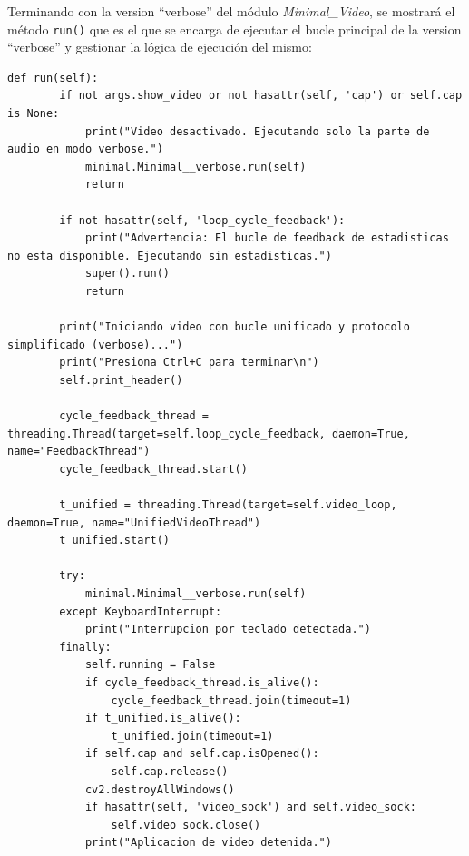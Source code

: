 Terminando con la version ``verbose'' del módulo \textit{Minimal\_Video}, se mostrará el método \texttt{run()} que es el que se encarga de ejecutar el bucle principal de la version ``verbose'' y gestionar la lógica de ejecución del mismo:
\begin{lstlisting}[style=pythonstyle, caption={Método \texttt{run()} de \textit{Minimal\_Video\_verbose}.}, label={lst:run_minimal_video_verbose}]
def run(self):
        if not args.show_video or not hasattr(self, 'cap') or self.cap is None:
            print("Video desactivado. Ejecutando solo la parte de audio en modo verbose.")
            minimal.Minimal__verbose.run(self)
            return

        if not hasattr(self, 'loop_cycle_feedback'):
            print("Advertencia: El bucle de feedback de estadisticas no esta disponible. Ejecutando sin estadisticas.")
            super().run()
            return

        print("Iniciando video con bucle unificado y protocolo simplificado (verbose)...")
        print("Presiona Ctrl+C para terminar\n")
        self.print_header()

        cycle_feedback_thread = threading.Thread(target=self.loop_cycle_feedback, daemon=True, name="FeedbackThread")
        cycle_feedback_thread.start()

        t_unified = threading.Thread(target=self.video_loop, daemon=True, name="UnifiedVideoThread")
        t_unified.start()

        try:
            minimal.Minimal__verbose.run(self)
        except KeyboardInterrupt:
            print("Interrupcion por teclado detectada.")
        finally:
            self.running = False
            if cycle_feedback_thread.is_alive():
                cycle_feedback_thread.join(timeout=1)
            if t_unified.is_alive():
                t_unified.join(timeout=1)
            if self.cap and self.cap.isOpened():
                self.cap.release()
            cv2.destroyAllWindows()
            if hasattr(self, 'video_sock') and self.video_sock:
                self.video_sock.close()
            print("Aplicacion de video detenida.")
\end{lstlisting}
\vspace{\baselineskip}

